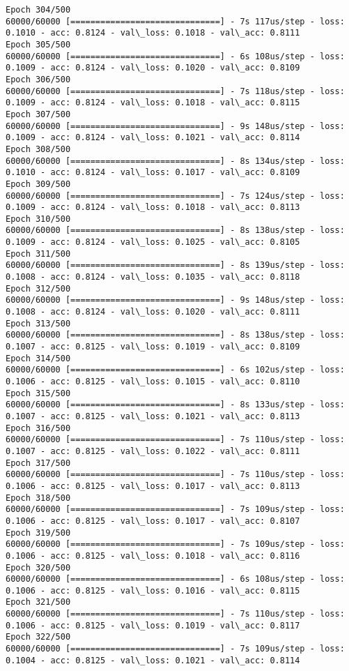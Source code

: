 \documentclass[11pt]{article}
\begin{document}
\begin{Verbatim}[commandchars=\\\{\}]
Epoch 304/500
60000/60000 [==============================] - 7s 117us/step - loss: 0.1010 - acc: 0.8124 - val\_loss: 0.1018 - val\_acc: 0.8111
Epoch 305/500
60000/60000 [==============================] - 6s 108us/step - loss: 0.1009 - acc: 0.8124 - val\_loss: 0.1020 - val\_acc: 0.8109
Epoch 306/500
60000/60000 [==============================] - 7s 118us/step - loss: 0.1009 - acc: 0.8124 - val\_loss: 0.1018 - val\_acc: 0.8115
Epoch 307/500
60000/60000 [==============================] - 9s 148us/step - loss: 0.1009 - acc: 0.8124 - val\_loss: 0.1021 - val\_acc: 0.8114
Epoch 308/500
60000/60000 [==============================] - 8s 134us/step - loss: 0.1010 - acc: 0.8124 - val\_loss: 0.1017 - val\_acc: 0.8109
Epoch 309/500
60000/60000 [==============================] - 7s 124us/step - loss: 0.1009 - acc: 0.8124 - val\_loss: 0.1018 - val\_acc: 0.8113
Epoch 310/500
60000/60000 [==============================] - 8s 138us/step - loss: 0.1009 - acc: 0.8124 - val\_loss: 0.1025 - val\_acc: 0.8105
Epoch 311/500
60000/60000 [==============================] - 8s 139us/step - loss: 0.1008 - acc: 0.8124 - val\_loss: 0.1035 - val\_acc: 0.8118
Epoch 312/500
60000/60000 [==============================] - 9s 148us/step - loss: 0.1008 - acc: 0.8124 - val\_loss: 0.1020 - val\_acc: 0.8111
Epoch 313/500
60000/60000 [==============================] - 8s 138us/step - loss: 0.1007 - acc: 0.8125 - val\_loss: 0.1019 - val\_acc: 0.8109
Epoch 314/500
60000/60000 [==============================] - 6s 102us/step - loss: 0.1006 - acc: 0.8125 - val\_loss: 0.1015 - val\_acc: 0.8110
Epoch 315/500
60000/60000 [==============================] - 8s 133us/step - loss: 0.1007 - acc: 0.8125 - val\_loss: 0.1021 - val\_acc: 0.8113
Epoch 316/500
60000/60000 [==============================] - 7s 110us/step - loss: 0.1007 - acc: 0.8125 - val\_loss: 0.1022 - val\_acc: 0.8111
Epoch 317/500
60000/60000 [==============================] - 7s 110us/step - loss: 0.1006 - acc: 0.8125 - val\_loss: 0.1017 - val\_acc: 0.8113
Epoch 318/500
60000/60000 [==============================] - 7s 109us/step - loss: 0.1006 - acc: 0.8125 - val\_loss: 0.1017 - val\_acc: 0.8107
Epoch 319/500
60000/60000 [==============================] - 7s 109us/step - loss: 0.1006 - acc: 0.8125 - val\_loss: 0.1018 - val\_acc: 0.8116
Epoch 320/500
60000/60000 [==============================] - 6s 108us/step - loss: 0.1006 - acc: 0.8125 - val\_loss: 0.1016 - val\_acc: 0.8115
Epoch 321/500
60000/60000 [==============================] - 7s 110us/step - loss: 0.1006 - acc: 0.8125 - val\_loss: 0.1019 - val\_acc: 0.8117
Epoch 322/500
60000/60000 [==============================] - 7s 109us/step - loss: 0.1004 - acc: 0.8125 - val\_loss: 0.1021 - val\_acc: 0.8114

\end{Verbatim}
\end{document}
